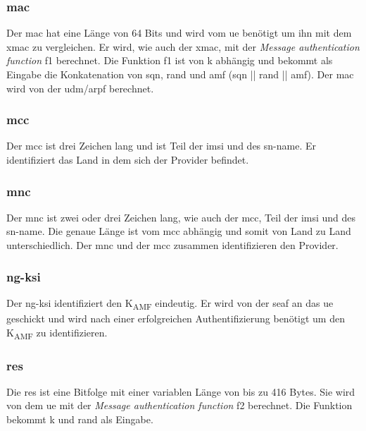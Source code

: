 \subsubsection{\gls{mac}}
Der \gls{mac} hat eine Länge von 64 Bits und wird vom \gls{ue} benötigt um ihn mit dem \gls{xmac} zu vergleichen.
Er wird, wie auch der \gls{xmac}, mit der \textit{Message authentication function} f1 berechnet. %
Die Funktion f1 ist von \gls{k} abhängig und bekommt als Eingabe die Konkatenation von \gls{sqn}, \gls{rand} und \gls{amf} (\gls{sqn} || \gls{rand} || \gls{amf}). %
Der \gls{mac} wird von der \gls{udm}/\gls{arpf} berechnet.

\subsubsection{\gls{mcc}}
Der \gls{mcc} ist drei Zeichen lang und ist Teil der \gls{imsi} und des \gls{sn-name}. %
Er identifiziert das Land in dem sich der Provider befindet. 

\subsubsection{\gls{mnc}}
Der \gls{mnc} ist zwei oder drei Zeichen lang, wie auch der \gls{mcc}, Teil der \gls{imsi} und des \gls{sn-name}. %
Die genaue Länge ist vom \gls{mcc} abhängig und somit von Land zu Land unterschiedlich.
Der \gls{mnc} und der \gls{mcc} zusammen identifizieren den Provider.

\subsubsection{\gls{ng-ksi}}
Der \gls{ng-ksi} identifiziert den K\textsubscript{AMF} eindeutig. %
Er wird von der \gls{seaf} an das \gls{ue} geschickt und wird nach einer erfolgreichen Authentifizierung benötigt um den K\textsubscript{AMF} zu identifizieren.

\subsubsection{\gls{res}}
Die \gls{res} ist eine Bitfolge mit einer variablen Länge von bis zu 416 Bytes. %
Sie wird von dem \gls{ue} mit der \textit{Message authentication function} f2 berechnet.
Die Funktion bekommt \gls{k} und \gls{rand} als Eingabe. %

